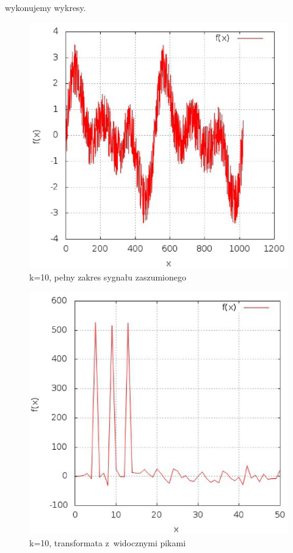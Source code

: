 \documentclass[12pt,a4paper]{article}
\begin{document}
\begin{enumerate}


wykonujemy wykresy.
\begin{figure}
\caption{k=10, pełny zakres sygnału zaszumionego}
\includegraphics{k_10_1.eps}
\end{figure}
\begin{figure}
\caption{k=10, transformata z~widocznymi pikami}
\includegraphics{k_10_2.eps}

\end{figure}
\end{enumerate}
\end{document}
